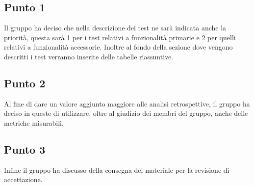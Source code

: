     \subsection{Punto 1} 
    Il gruppo ha deciso che nella descrizione dei test ne sarà indicata anche la priorità, questa sarà 1 per i test relativi a funzionalità primarie e 2 per quelli relativi a funzionalità accessorie.
    Inoltre al fondo della sezione dove vengono descritti i test verranno inserite delle tabelle riassuntive.
    \subsection{Punto 2}
    Al fine di dare un valore aggiunto maggiore alle analisi retrospettive, il gruppo ha deciso in queste di utilizzare, oltre al giudizio dei membri del gruppo, anche delle metriche misurabili.
    \subsection{Punto 3}
    Infine il gruppo ha discusso della consegna del materiale per la revisione di accettazione.
